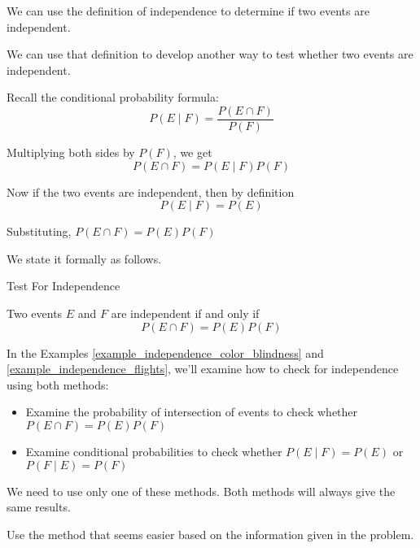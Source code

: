 We can use the definition of independence to determine if two events are independent.

We can use that definition to develop another way to test whether two events are independent.

Recall the conditional probability formula:
\[ P(E \mid F) = \frac{P(E \cap F)}{P(F)} \]

Multiplying both sides by \(P(F)\), we get
\[ P(E \cap F) = P(E \mid F) P(F) \]

Now if the two events are independent, then by definition
\[ P(E \mid F) = P(E) \]

Substituting, \( P(E \cap F) = P(E) P(F) \)

We state it formally as follows.
\begin{summarybox}{Test For Independence}\label{summary_test_for_independence}

    Two events \(E\) and \(F\) are independent if and only if
    \[ P(E \cap F) = P(E)P(F) \]
\end{summarybox}

In the Examples \ref{example_independence_color_blindness} and \ref{example_independence_flights}, we'll examine how to check for independence using both methods:
\begin{itemize}
    \item Examine the probability of intersection of events to check whether \(P(E \cap F) = P(E)P(F)\)
    \item Examine conditional probabilities to check whether \(P(E \mid F)=P(E)\) or \(P(F \mid E)=P(F)\)
\end{itemize}

We need to use only one of these methods. Both methods will always give the same results.

Use the method that seems easier based on the information given in the problem.

